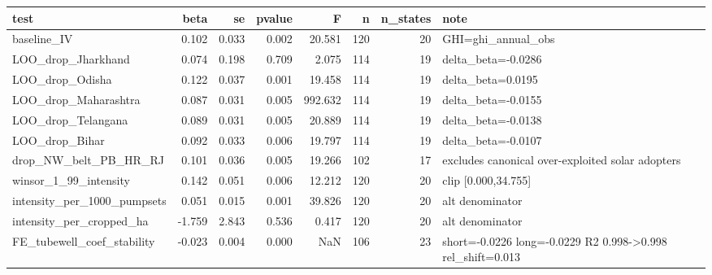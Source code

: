 \begin{tabular}{lrrrrrrl}
\toprule
test & beta & se & pvalue & F & n & n_states & note \\
\midrule
baseline_IV & 0.102 & 0.033 & 0.002 & 20.581 & 120 & 20 & GHI=ghi_annual_obs \\
LOO_drop_Jharkhand & 0.074 & 0.198 & 0.709 & 2.075 & 114 & 19 & delta_beta=-0.0286 \\
LOO_drop_Odisha & 0.122 & 0.037 & 0.001 & 19.458 & 114 & 19 & delta_beta=0.0195 \\
LOO_drop_Maharashtra & 0.087 & 0.031 & 0.005 & 992.632 & 114 & 19 & delta_beta=-0.0155 \\
LOO_drop_Telangana & 0.089 & 0.031 & 0.005 & 20.889 & 114 & 19 & delta_beta=-0.0138 \\
LOO_drop_Bihar & 0.092 & 0.033 & 0.006 & 19.797 & 114 & 19 & delta_beta=-0.0107 \\
drop_NW_belt_PB_HR_RJ & 0.101 & 0.036 & 0.005 & 19.266 & 102 & 17 & excludes canonical over-exploited solar adopters \\
winsor_1_99_intensity & 0.142 & 0.051 & 0.006 & 12.212 & 120 & 20 & clip [0.000,34.755] \\
intensity_per_1000_pumpsets & 0.051 & 0.015 & 0.001 & 39.826 & 120 & 20 & alt denominator \\
intensity_per_cropped_ha & -1.759 & 2.843 & 0.536 & 0.417 & 120 & 20 & alt denominator \\
FE_tubewell_coef_stability & -0.023 & 0.004 & 0.000 & NaN & 106 & 23 & short=-0.0226 long=-0.0229 R2 0.998->0.998 rel_shift=0.013 \\
\bottomrule
\end{tabular}
